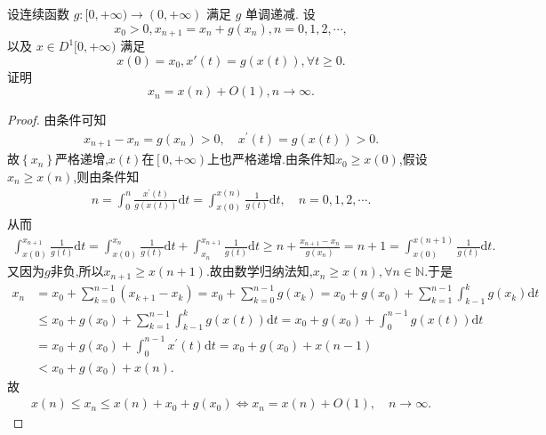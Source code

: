 \documentclass[../../main.tex]{subfiles}%
\begin{document}
\begin{example}
设连续函数 $g:[0,+\infty)\to(0,+\infty)$ 满足 $g$ 单调递减. 设
\[
x_0>0, x_{n+1}=x_n+g(x_n), n=0,1,2,\cdots,
\]
以及 $x\in D^1[0,+\infty)$ 满足
\[
x(0)=x_0 ,x'(t)=g(x(t)), \forall t\geqslant0.
\]
证明
\[
x_n=x(n)+O(1), n\to\infty.
\]
\end{example}
\begin{proof}

由条件可知
\begin{align*}
x_{n+1}-x_n=g\left( x_n \right) >0,\quad x^\prime \left( t \right) =g\left( x\left( t \right) \right) >0.
\end{align*}
故$\left\{ x_n \right\}$严格递增,$x\left( t \right)$在$\left[ 0,+\infty \right)$上也严格递增.由条件知$x_0\geqslant x\left( 0 \right)$,假设$x_n\geqslant x\left( n \right)$,则由条件知
\begin{align*}
n=\int_0^n{\frac{x^\prime \left( t \right)}{g\left( x(t) \right)}\mathrm{d}t}=\int_{x\left( 0 \right)}^{x\left( n \right)}{\frac{1}{g\left( t \right)}\mathrm{d}t},\quad n=0,1,2,\cdots .
\end{align*}
从而
\begin{align*}
\int_{x\left( 0 \right)}^{x_{n+1}}{\frac{1}{g\left( t \right)}\mathrm{d}t}=\int_{x\left( 0 \right)}^{x_n}{\frac{1}{g\left( t \right)}\mathrm{d}t}+\int_{x_n}^{x_{n+1}}{\frac{1}{g\left( t \right)}\mathrm{d}t}\geqslant n+\frac{x_{n+1}-x_n}{g\left( x_n \right)}=n+1=\int_{x\left( 0 \right)}^{x\left( n+1 \right)}{\frac{1}{g\left( t \right)}\mathrm{d}t}.
\end{align*}
又因为$g$非负,所以$x_{n+1}\geqslant x\left( n+1 \right)$.故由数学归纳法知,$x_n\geqslant x\left( n \right),\forall n\in \mathbb{N}$.于是
\begin{align*}
x_n&=x_0+\sum\limits_{k=0}^{n-1}{\left( x_{k+1}-x_k \right)}=x_0+\sum\limits_{k=0}^{n-1}{g\left( x_k \right)}=x_0+g\left( x_0 \right) +\sum\limits_{k=1}^{n-1}{\int_{k-1}^k{g\left( x_k \right) \mathrm{d}t}}
\\
&\leqslant x_0+g\left( x_0 \right) +\sum\limits_{k=1}^{n-1}{\int_{k-1}^k{g\left( x\left( t \right) \right) \mathrm{d}t}}=x_0+g\left( x_0 \right) +\int_0^{n-1}{g\left( x\left( t \right) \right) \mathrm{d}t}
\\
&=x_0+g\left( x_0 \right) +\int_0^{n-1}{x^\prime \left( t \right) \mathrm{d}t}=x_0+g\left( x_0 \right) +x\left( n-1 \right) 
\\
&<x_0+g\left( x_0 \right) +x\left( n \right) .
\end{align*}
故
\begin{align*}
x\left( n \right) \leqslant x_n\leqslant x\left( n \right) +x_0+g\left( x_0 \right) \Longleftrightarrow x_n=x\left( n \right) +O\left( 1 \right) ,\quad n\rightarrow \infty .
\end{align*}

\end{proof}
\end{document}
